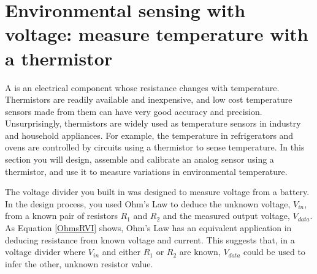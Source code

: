 %

\section{Environmental sensing with voltage: measure temperature with a thermistor}
A  is an electrical component whose resistance changes with temperature.
Thermistors are readily available and inexpensive, and low cost temperature sensors made from them can have very good accuracy and precision.
Unsurprisingly, thermistors are widely used as temperature sensors in industry and household appliances. 
For example, the temperature in refrigerators and ovens are controlled by circuits using a thermistor to sense temperature.
In this section you will design, assemble and calibrate an analog sensor using a thermistor, and use it to measure variations in environmental temperature.

The voltage divider you built in  was designed to measure voltage from a battery. %
In the design process, you used Ohm's Law to deduce the unknown voltage, $V_{in}$, from a known pair of resistors $R_1$ and $R_2$ and the measured output voltage, $V_{data}$.
As Equation \ref{OhmsRVI} shows, Ohm's Law has an equivalent application in deducing resistance from known voltage and current.
This suggests that, in a voltage divider where $V_{in}$ and either $R_1$ or $R_2$ are known, $V_{data}$ could be used to infer the other, unknown resistor value.


